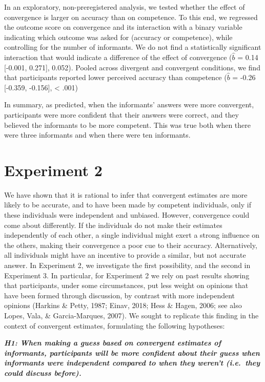 \documentclass[
  doc,floatsintext]{apa6}
\begin{document}
In an exploratory, non-preregistered analysis, we tested whether the effect of convergence is larger on accuracy than on competence. To this end, we regressed the outcome score on convergence and its interaction with a binary variable indicating which outcome was asked for (accuracy or competence), while controlling for the number of informants. We do not find a statistically significant interaction that would indicate a difference of the effect of convergence (\(\hat{b}\) = 0.14 {[}-0.001, 0.271{]}, 0.052). Pooled across divergent and convergent conditions, we find that participants reported lower perceived accuracy than competence (\(\hat{b}\) = -0.26 {[}-0.359, -0.156{]}, \textless{} .001)

In summary, as predicted, when the informants' answers were more convergent, participants were more confident that their answers were correct, and they believed the informants to be more competent. This was true both when there were three informants and when there were ten informants.

\section{Experiment 2}\label{experiment-2}

We have shown that it is rational to infer that convergent estimates are more likely to be accurate, and to have been made by competent individuals, only if these individuals were independent and unbiased. However, convergence could come about differently. If the individuals do not make their estimates independently of each other, a single individual might exert a strong influence on the others, making their convergence a poor cue to their accuracy. Alternatively, all individuals might have an incentive to provide a similar, but not accurate answer. In Experiment 2, we investigate the first possibility, and the second in Experiment 3. In particular, for Experiment 2 we rely on past results showing that participants, under some circumstances, put less weight on opinions that have been formed through discussion, by contrast with more independent opinions (Harkins \& Petty, 1987; Einav, 2018; Hess \& Hagen, 2006; see also Lopes, Vala, \& Garcia-Marques, 2007). We sought to replicate this finding in the context of convergent estimates, formulating the following hypotheses:

\textbf{\emph{H1: When making a guess based on convergent estimates of informants, participants will be more confident about their guess when informants were independent compared to when they weren't (i.e.~they could discuss before).}}
\end{document}

